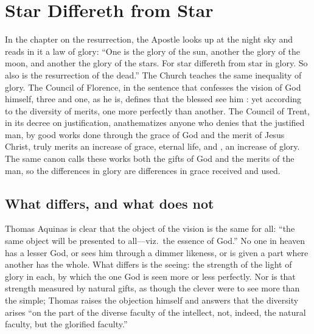 \section{Star Differeth from Star}

In the chapter on the resurrection, the Apostle looks up at the night sky and reads in it a law of glory: ``One is the glory of the sun, another the glory of the moon, and another the glory of the stars. For star differeth from star in glory. So also is the resurrection of the dead.'' The Church teaches the same inequality of glory. The Council of Florence, in the sentence that confesses the vision of God himself, three and one, as he is, defines that the blessed see him : yet according to the diversity of merits, one more perfectly than another. The Council of Trent, in its decree on justification, anathematizes anyone who denies that the justified man, by good works done through the grace of God and the merit of Jesus Christ, truly merits an increase of grace, eternal life, and , an increase of glory. The same canon calls these works both the gifts of God and the merits of the man, so the differences in glory are differences in grace received and used.

\subsection{What differs, and what does not}

Thomas Aquinas is clear that the object of the vision is the same for all: ``the same object will be presented to all---viz.\ the essence of God.'' No one in heaven has a lesser God, or sees him through a dimmer likeness, or is given a part where another has the whole. What differs is the seeing: the strength of the light of glory in each, by which the one God is seen more or less perfectly. Nor is that strength measured by natural gifts, as though the clever were to see more than the simple; Thomas raises the objection himself and answers that the diversity arises ``on the part of the diverse faculty of the intellect, not, indeed, the natural faculty, but the glorified faculty.''

